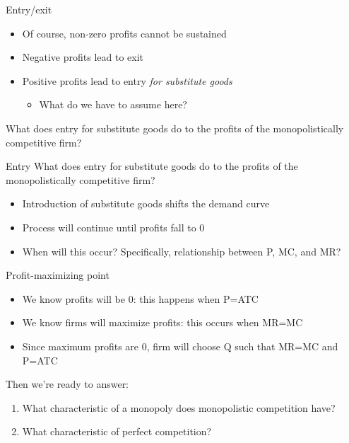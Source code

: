 \documentclass[aspectratio=169]{beamer}
\begin{document}
\begin{frame}{Entry/exit}
    \begin{itemize}
        \item Of course, non-zero profits cannot be sustained
        \item Negative profits lead to exit
        \item Positive profits lead to entry \textit{for substitute goods}
        \begin{itemize}
            \item What do we have to assume here?
        \end{itemize}
    \end{itemize}

    What does entry for substitute goods do to the profits of the monopolistically competitive firm?
\end{frame}

\begin{frame}{Entry}
    What does entry for substitute goods do to the profits of the monopolistically competitive firm?
    \begin{itemize}
        \item Introduction of substitute goods shifts the demand curve
        \item Process will continue until profits fall to 0
        \item When will this occur? Specifically, relationship between P, MC, and MR?
    \end{itemize}
    
\end{frame}

\begin{frame}{Profit-maximizing point}
    \begin{itemize}
        \item We know profits will be 0: this happens when P=ATC
        \item We know firms will maximize profits: this occurs when MR=MC
        \item Since maximum profits are 0, firm will choose Q such that MR=MC and P=ATC
    \end{itemize}
    Then we're ready to answer:
    \begin{enumerate}
        \item What characteristic of a monopoly does monopolistic competition have?
        \item What characteristic of perfect competition?
    \end{enumerate}
    
\end{frame}
\end{document}

